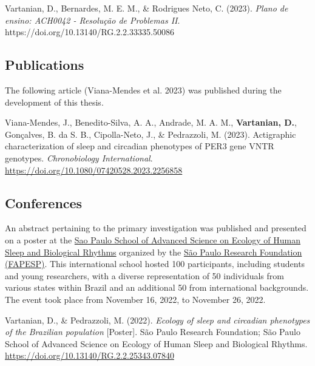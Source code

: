 \documentclass[
  12pt,
  a4paper,
  oneside]{tesesusp}
\begin{document}
\vspace{15pt}

\noindent Vartanian, D., Bernardes, M. E. M., \& Rodrigues Neto, C.
(2023). \emph{Plano de ensino: ACH0042 - Resolução de Problemas II}.
https://doi.org/10.13140/RG.2.2.33335.50086

\hypertarget{publications}{%
\subsection{Publications}\label{publications}}

The following article (Viana-Mendes et al. 2023) was published during
the development of this thesis.

\vspace{15pt}

\noindent Viana-Mendes, J., Benedito-Silva, A. A., Andrade, M. A. M.,
\textbf{Vartanian, D.}, Gonçalves, B. da S. B., Cipolla-Neto, J., \&
Pedrazzoli, M. (2023). Actigraphic characterization of sleep and
circadian phenotypes of PER3 gene VNTR genotypes. \emph{Chronobiology
International}. \url{https://doi.org/10.1080/07420528.2023.2256858}

\hypertarget{conferences}{%
\subsection{Conferences}\label{conferences}}

An abstract pertaining to the primary investigation was published and
presented on a poster at the
\href{https://espca.fapesp.br/school/sao_paulo_school_of_advanced_science_on_ecology_of_human_sleep_and_biological_rhythms/101/}{Sao
Paulo School of Advanced Science on Ecology of Human Sleep and
Biological Rhythms} organized by the \href{https://fapesp.br/en}{São
Paulo Research Foundation (FAPESP)}. This international school hosted
100 participants, including students and young researchers, with a
diverse representation of 50 individuals from various states within
Brazil and an additional 50 from international backgrounds. The event
took place from November 16, 2022, to November 26, 2022.

\vspace{15pt}

\noindent Vartanian, D., \& Pedrazzoli, M. (2022). \emph{Ecology of
sleep and circadian phenotypes of the Brazilian population}
{[}Poster{]}. São Paulo Research Foundation; São Paulo School of
Advanced Science on Ecology of Human Sleep and Biological Rhythms.
\url{https://doi.org/10.13140/RG.2.2.25343.07840}
\end{document}
